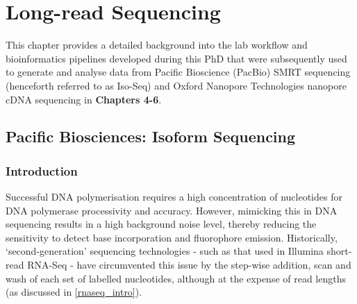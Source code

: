 \chapter{Long-read Sequencing}\label{ch: long_read_sequencing}

This chapter provides a detailed background into the lab workflow and bioinformatics pipelines developed during this PhD that were subsequently used to generate and analyse data from Pacific Bioscience (PacBio) SMRT sequencing (henceforth referred to as Iso-Seq) and Oxford Nanopore Technologies nanopore cDNA sequencing in \textbf{Chapters 4-6}. 

\section{Pacific Biosciences: Isoform Sequencing}
\label{sec:pb_isoform_sequencing}

\subsection{Introduction}
Successful DNA polymerisation requires a high concentration of nucleotides for DNA polymerase processivity and accuracy. However, mimicking this in DNA sequencing results in a high background noise level, thereby reducing the sensitivity to detect base incorporation and fluorophore emission. Historically, ‘second-generation' sequencing technologies - such as that used in Illumina short-read RNA-Seq - have circumvented this issue by the step-wise addition, scan and wash of each set of labelled nucleotides, although at the expense of read lengths (as discussed in \cref{rnaseq_intro}). 


